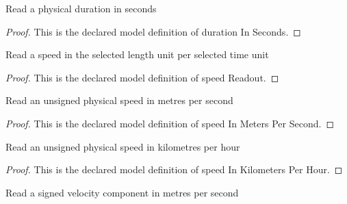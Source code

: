 \begin{definition}
  \label{def:physics:phyx-mini-0738:phyxminiproblems-problemphyxmini0738-durationinseconds}
  Read a physical duration in seconds
\end{definition}
\begin{proof}
  This is the declared model definition of duration In Seconds.
\end{proof}
\begin{definition}
  \label{def:physics:phyx-mini-0738:phyxminiproblems-problemphyxmini0738-speedreadout}
  Read a speed in the selected length unit per selected time unit
\end{definition}
\begin{proof}
  This is the declared model definition of speed Readout.
\end{proof}
\begin{definition}
  \label{def:physics:phyx-mini-0738:phyxminiproblems-problemphyxmini0738-speedinmeterspersecond}
  Read an unsigned physical speed in metres per second
\end{definition}
\begin{proof}
  This is the declared model definition of speed In Meters Per Second.
\end{proof}
\begin{definition}
  \label{def:physics:phyx-mini-0738:phyxminiproblems-problemphyxmini0738-speedinkilometersperhour}
  Read an unsigned physical speed in kilometres per hour
\end{definition}
\begin{proof}
  This is the declared model definition of speed In Kilometers Per Hour.
\end{proof}
\begin{definition}
  \label{def:physics:phyx-mini-0738:phyxminiproblems-problemphyxmini0738-signedvelocityinmeterspersecond}
  Read a signed velocity component in metres per second
\end{definition}

